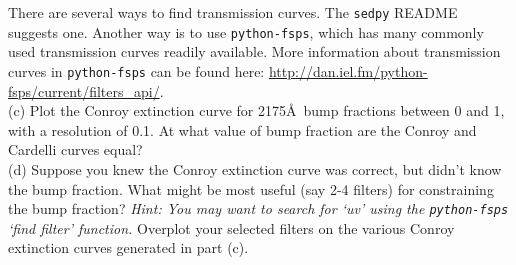\documentclass{article}
\begin{document}
There are several ways to find transmission curves.  The \texttt{sedpy} README suggests one.  Another way is to use \texttt{python-fsps}, which has many commonly used transmission curves readily available.  More information about transmission curves in \texttt{python-fsps} can be found here: \url{http://dan.iel.fm/python-fsps/current/filters_api/}. \\

(c)  Plot the Conroy extinction curve for 2175\AA\ bump fractions between 0 and 1, with a resolution of 0.1.  At what value of bump fraction are the Conroy and Cardelli curves equal?  \\

(d) Suppose you knew the Conroy extinction curve was correct, but didn't know the bump fraction.  What might be most useful (say 2-4 filters) for constraining the bump fraction?  \textit{Hint: You may want to search for `uv' using the \texttt{python-fsps} `find filter' function.}  Overplot your selected filters on the various Conroy extinction curves generated in part (c).
\end{document}
